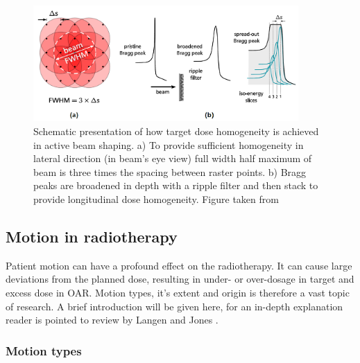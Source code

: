 \documentclass[type=dr, dr=rernat, accentcolor=tud7b,colorbacktitle, bigchapter, openright, twoside, 12pt ]{tudthesis}
\begin{document}
\begin{figure}[H]
\begin{center}
\includegraphics[width=0.9\textwidth]{./Images/active.png}
\caption{Schematic presentation of how target dose homogeneity is achieved in active beam shaping. a) To provide sufficient homogeneity in lateral direction (in beam's eye view) full width
half maximum of beam is three times the spacing between raster points. b) Bragg peaks are broadened in depth with a ripple filter and then stack to provide longitudinal dose homogeneity. 
Figure taken from \cite{Richter2012}}
\label{active}
\end{center}
\end{figure}


\newpage

\subsection{Motion in radiotherapy}
\label{sec:motion}

Patient motion can have a profound effect on the radiotherapy. It can cause large deviations from the planned dose, resulting in under- or over-dosage in target and excess dose in OAR. Motion types, it's extent and origin is therefore a vast topic of research. 
A brief introduction will be given here, for an in-depth explanation reader is pointed to review by Langen and Jones \cite{Langen2001}.


\subsubsection{Motion types}
\end{document}
